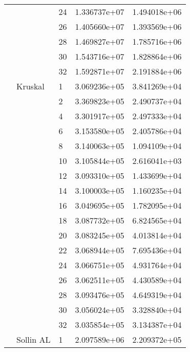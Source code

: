 \begin{tabular}{lllrr}
                      &            & 24 &  1.336737e+07 &  1.494018e+06 \\
                      &            & 26 &  1.405660e+07 &  1.393569e+06 \\
                      &            & 28 &  1.469827e+07 &  1.785716e+06 \\
                      &            & 30 &  1.543716e+07 &  1.828864e+06 \\
                      &            & 32 &  1.592871e+07 &  2.191884e+06 \\
                      & Kruskal & 1  &  3.069236e+05 &  3.841269e+04 \\
                      &            & 2  &  3.369823e+05 &  2.490737e+04 \\
                      &            & 4  &  3.301917e+05 &  2.497333e+04 \\
                      &            & 6  &  3.153580e+05 &  2.405786e+04 \\
                      &            & 8  &  3.140063e+05 &  1.094109e+04 \\
                      &            & 10 &  3.105844e+05 &  2.616041e+03 \\
                      &            & 12 &  3.093310e+05 &  1.433699e+04 \\
                      &            & 14 &  3.100003e+05 &  1.160235e+04 \\
                      &            & 16 &  3.049695e+05 &  1.782095e+04 \\
                      &            & 18 &  3.087732e+05 &  6.824565e+04 \\
                      &            & 20 &  3.083245e+05 &  4.013814e+04 \\
                      &            & 22 &  3.068944e+05 &  7.695436e+04 \\
                      &            & 24 &  3.066751e+05 &  4.931764e+04 \\
                      &            & 26 &  3.062511e+05 &  4.430589e+04 \\
                      &            & 28 &  3.093476e+05 &  4.649319e+04 \\
                      &            & 30 &  3.056024e+05 &  3.328840e+04 \\
                      &            & 32 &  3.035854e+05 &  3.134387e+04 \\
                      & Sollin AL & 1  &  2.097589e+06 &  2.209372e+05 \\

\end{tabular}
